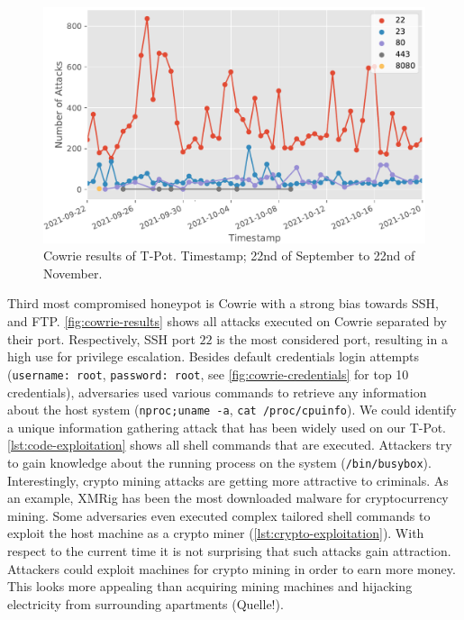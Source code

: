\begin{figure}[ht]
    \centering
    \includegraphics[width=\textwidth]{figures/tpot-cowrie-port.pdf}
    \caption[Cowrie results of T-Pot]{Cowrie results of T-Pot. Timestamp; 22nd of September to 22nd of November.}
    \label{fig:cowrie-results}
\end{figure}

Third most compromised honeypot is Cowrie with a strong bias towards SSH, and FTP.
\autoref{fig:cowrie-results} shows all attacks executed on Cowrie separated by their port.
Respectively, SSH port $22$ is the most considered port, resulting in a high use for privilege escalation.
Besides default credentials login attempts (\verb|username: root|, \verb|password: root|, see \autoref{fig:cowrie-credentials} for top 10 credentials), adversaries used various commands to retrieve any information about the host system (\verb|nproc;uname -a|, \verb|cat /proc/cpuinfo|).
We could identify a unique information gathering attack that has been widely used on our T-Pot.
\autoref{lst:code-exploitation} shows all shell commands that are executed.
Attackers try to gain knowledge about the running process on the system (\verb|/bin/busybox|).
Interestingly, crypto mining attacks are getting more attractive to criminals.
As an example, XMRig has been the most downloaded malware for cryptocurrency mining.
Some adversaries even executed complex tailored shell commands to exploit the host machine as a crypto miner (\autoref{lst:crypto-exploitation}).
With respect to the current time it is not surprising that such attacks gain attraction.
Attackers could exploit machines for crypto mining in order to earn more money.
This looks more appealing than acquiring mining machines and hijacking electricity from surrounding apartments (Quelle!).

